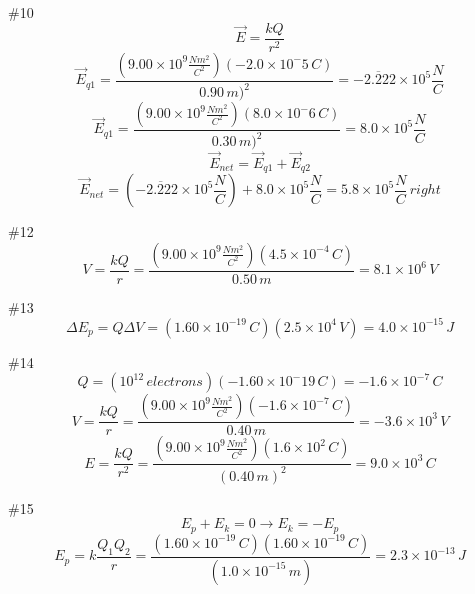 \documentclass[12pt]{article}
\begin{document}
\pagebreak

\#10
\begin{equation}
\overrightarrow{E}=\frac{kQ}{r^2}
\end{equation}
\begin{equation}
\overrightarrow{E}_{q1}=\frac{(9.00\times10^9\frac{Nm^2}{C^2})(-2.0\times 10^-5\,C)}{0.90\,m)^2}=-2.\overline{2}22\times 10^5\frac{N}{C}
\end{equation}
\begin{equation}
\overrightarrow{E}_{q1}=\frac{(9.00\times10^9\frac{Nm^2}{C^2})(8.0\times 10^-6\,C)}{0.30\,m)^2}=8.0\times 10^5\frac{N}{C}
\end{equation}
\begin{equation}
\overrightarrow{E}_{net}=\overrightarrow{E}_{q1}+\overrightarrow{E}_{q2}
\end{equation}
\begin{equation}
\overrightarrow{E}_{net}=(-2.\overline{2}22\times 10^5\frac{N}{C})+8.0\times 10^5\frac{N}{C}=5.8\times 10^5\frac{N}{C}\,right
\end{equation}

\#12
\begin{equation}
V=\frac{kQ}{r}=\frac{(9.00\times10^9\frac{Nm^2}{C^2})(4.5\times 10^{-4}\,C)}{0.50\,m}=8.1\times 10^6\,V
\end{equation}

\#13
\begin{equation}
\Delta E_p=Q\Delta V=(1.60\times 10^{-19}\,C)(2.5\times 10^4\,V)=4.0\times 10^{-15}\,J
\end{equation}

\#14
\begin{equation}
Q=(10^{12}\,electrons)(-1.60\times 10^-19\,C)=-1.6\times 10^{-7}\,C
\end{equation}
\begin{equation}
V=\frac{kQ}{r}=\frac{(9.00\times10^9\frac{Nm^2}{C^2})(-1.6\times 10^{-7}\,C)}{0.40\,m}=-3.6\times 10^3\,V
\end{equation}
\begin{equation}
E=\frac{kQ}{r^2}=\frac{(9.00\times10^9\frac{Nm^2}{C^2})(1.6\times 10^2\,C)}{(0.40\,m)^2}=9.0\times10^3\,C
\end{equation}

\#15
\begin{equation}
E_p+E_k=0 \rightarrow E_k=-E_p
\end{equation}
\begin{equation}
E_{p}=k\frac{Q_1Q_2}{r}=\frac{(1.60\times 10^{-19}\,C)(1.60\times 10^{-19}\,C)}{(1.0\times 10^{-15}\, m)}=2.3\times 10^{-13}\,J
\end{equation}
\end{document}
